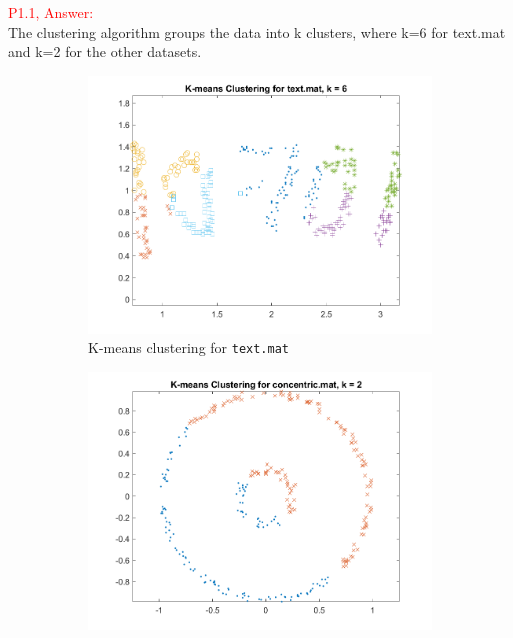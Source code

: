 \documentclass[11pt]{article}
\begin{document}
\clearpage
\textcolor{red}{P1.1, Answer:}\\

The clustering algorithm groups the data into k clusters, where k=6 for text.mat and k=2 for the other datasets.
\begin{figure}[!ht]
    \centering
    \begin{subfigure}{0.45\textwidth}
        \includegraphics[width=\linewidth]{k_means_clustering_text.mat.png}
        \caption{K-means clustering for \texttt{text.mat}}
    \end{subfigure}
    \begin{subfigure}{0.45\textwidth}
        \includegraphics[width=\linewidth]{k_means_clustering_concentric.mat.png}

\end{subfigure}
\end{figure}
\end{document}

